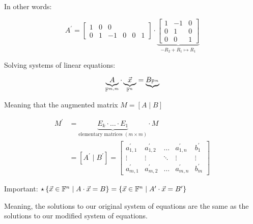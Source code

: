 {{In other words:

\[
	A^{\prime} = \begin{bmatrix} 1 & 0 & 0 \\ 0 & 1 & -1 & 0 & 0 & 1 \end{bmatrix} \cdot \underbrace{\begin{bmatrix} 1 & -1 & 0 \\ 0 & 1 & 0 \\ 0 & 0 & 1\end{bmatrix}}_{-R_2 + R_1 \mapsto R_1}
\]


Solving systems of linear equations:

\[
	\underbrace{A}_{\FF^{m,m}} \cdot  \underbrace{\vec{x} }_{\FF^{n}} = \underbrace{B_{\FF^{m}}}
\]

Meaning that the augmented matrix \(M = \left[ A \mid B \right]\)

\begin{align*}
	M^{\prime} & = \underbrace{E_{k} \cdot \ldots \cdot E_{1}}_{\text{elementary matrices } (m \times m)} \cdot M                                                                                                                                                                                                              \\
	           & = \left[ A^{\prime} \mid B^{\prime} \right] = \left[ \begin{array}{cccc|c} a_{1,1}^{\prime} & a_{1,2}^{\prime} & \ldots & a_{1,n}^{\prime} & b_1^{\prime} \\ \vdots & \vdots & \ddots & \vdots & \vdots \\ a_{m,1}^{\prime} & a_{m,2}^{\prime} & \ldots & a_{m,n}^{\prime} & b_m^{\prime} \end{array} \right]
\end{align*}

Important: \(\star \left\{ \vec{x} \in \FF^{n} \mid A \cdot \vec{x} = B\right\}  = \left\{ \vec{x} \in \FF^{n} \mid A^{\prime} \cdot \vec{x} = B^{\prime}\right\} \)

Meaning, the solutions to our original system of equations are the same as the solutions to our modified system of equations.

}}
